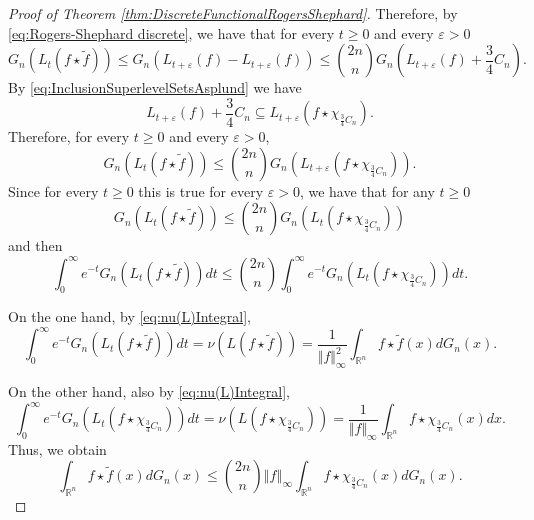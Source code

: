 \documentclass{amsart}
\newcommand{\R}{\mathbb R}
\newcommand{\norma}[1]{\left\Vert#1\right\Vert}
\theoremstyle{remark}
\theoremstyle{definition}
\numberwithin{equation}{section}
\begin{document}
\begin{proof}[Proof of Theorem \ref{thm:DiscreteFunctionalRogersShephard}]
Therefore, by \eqref{eq:Rogers-Shephard discrete}, we have that for every $t\geq0$ and every $\varepsilon>0$
$$
G_n(L_t(f\star\tilde{f}))\leq G_n\left(L_{t+\varepsilon}(f)-L_{t+\varepsilon}(f)\right)\leq\binom{2n}{n}G_n\left(L_{t+\varepsilon}(f)+\frac{3}{4}C_n\right).
$$
By \eqref{eq:InclusionSuperlevelSetsAsplund} we have
$$
L_{t+\varepsilon}(f)+\frac{3}{4}C_n\subseteq L_{t+\varepsilon}\left(f\star \chi_{\frac{3}{4}C_n} \right).
$$
Therefore, for every $t\geq0$ and every $\varepsilon>0$,
$$
G_n(L_t(f\star\tilde{f}))\leq \binom{2n}{n}G_n\left(L_{t+\varepsilon}\left(f\star \chi_{\frac{3}{4}C_n} \right)\right).
$$
Since for every $t\geq 0$ this is true for every $\varepsilon>0$, we have that for any $t\geq 0$
$$
G_n(L_t(f\star\tilde{f}))\leq \binom{2n}{n}G_n\left(L_{t}\left(f\star \chi_{\frac{3}{4}C_n} \right)\right)
$$
and then
$$
\int_0^\infty e^{-t}G_n(L_t(f\star\tilde{f}))dt\leq\binom{2n}{n}\int_0^\infty e^{-t}G_n\left(L_t\left(f\star\chi_{\frac{3}{4}C_n} \right)\right)dt.
$$

On the one hand, by \eqref{eq:nu(L)Integral},
$$
\int_0^\infty e^{-t}G_n(L_t(f\star\tilde{f}))dt=\nu(L(f\star\tilde{f}))=\frac{1}{\Vert f\Vert_\infty^2}\int_{\R^n}f\star\tilde{f}(x)dG_n(x).
$$

On the other hand,  also by \eqref{eq:nu(L)Integral},
$$
\int_0^\infty e^{-t}G_n\left(L_t\left(f\star\chi_{\frac{3}{4}C_n}\right)\right)dt=\nu\left(L\left(f\star\chi_{\frac{3}{4}C_n}\right)\right)=\frac{1}{\Vert f\Vert_\infty}\int_{\R^n}f\star\chi_{\frac{3}{4}C_n}(x)dx.
$$
Thus, we obtain
$$
\int_{\R^n} f \star \tilde{f}(x) dG_n(x) \leq \binom{2n}{n} \norma{f}_{\infty} \int_{\R^n} f\star\chi_{\frac{3}{4}C_n}(x) dG_n(x).
$$
\end{proof}
\end{document}
